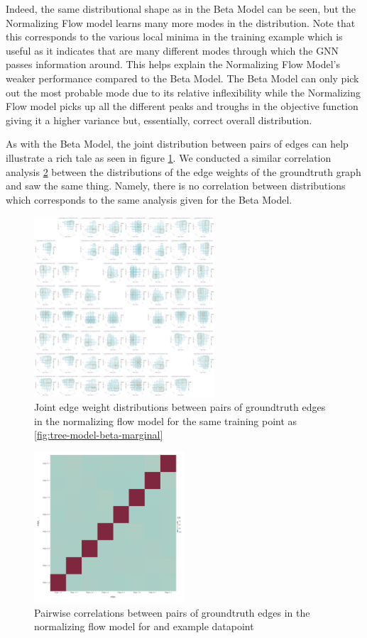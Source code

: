 Indeed, the same distributional shape as in the Beta Model can be seen, but the Normalizing Flow model learns many more modes in the distribution. Note that this corresponds to the various local minima in the training example which is useful as it indicates that are many different modes through which the GNN passes information around. This helps explain the Normalizing Flow Model's weaker performance compared to the Beta Model. The Beta Model can only pick out the most probable mode due to its relative inflexibility while the Normalizing Flow model picks up all the different peaks and troughs in the objective function giving it a higher variance but, essentially, correct overall distribution.

As with the Beta Model, the joint distribution between pairs of edges can help illustrate a rich tale as seen in figure \ref{fig:tree-model-dnfg-joint}. We conducted a similar correlation analysis \ref{fig:tree-model-dnfg-cor} between the distributions of the edge weights of the groundtruth graph and saw the same thing. Namely, there is no correlation between distributions which corresponds to the same analysis given for the Beta Model.

\begin{figure}[htb]
	\centering
	\includegraphics[width=0.6\textwidth]{images/tree-model-dnfg-joint.pdf}
	\caption{Joint edge weight distributions between pairs of groundtruth edges in the normalizing flow model for the same training point as \ref{fig:tree-model-beta-marginal}}
	\label{fig:tree-model-dnfg-joint}
\end{figure}

\begin{figure}[H]
	\centering
	\includegraphics[width=0.5\textwidth]{images/tree-model-dnfg-cor.pdf}
	\caption{Pairwise correlations between pairs of groundtruth edges in the normalizing flow model for and example datapoint}
	\label{fig:tree-model-dnfg-cor}
\end{figure}

\newpage
